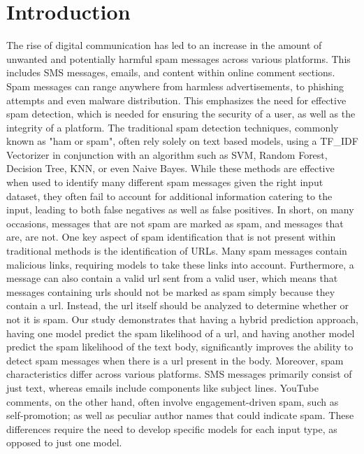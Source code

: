 \documentclass{article}
\begin{document}
\section{Introduction}
The rise of digital communication has led to an increase in the amount of unwanted and potentially harmful spam messages across various platforms. This includes SMS messages, emails, and content within online comment sections. Spam messages can range anywhere from harmless advertisements, to phishing attempts and even malware distribution. This emphasizes the need for effective spam detection, which is needed for ensuring the security of a user, as well as the integrity of a platform. The traditional spam detection techniques, commonly known as "ham or spam", often rely solely on text based models, using a TF\_IDF Vectorizer in conjunction with an algorithm such as SVM, Random Forest, Decision Tree, KNN, or even Naive Bayes. While these methods are effective when used to identify many different spam messages given the right input dataset, they often fail to account for additional information catering to the input, leading to both false negatives as well as false positives. In short, on many occasions, messages that are not spam are marked as spam, and messages that are, are not.
\newline
\newline
One key aspect of spam identification that is not present within traditional methods is the identification of URLs. Many spam messages contain malicious links, requiring models to take these links into account. Furthermore, a message can also contain a valid url sent from a valid user, which means that messages containing urls should not be marked as spam simply because they contain a url. Instead, the url itself should be analyzed to determine whether or not it is spam. Our study demonstrates that having a hybrid prediction approach, having one model predict the spam likelihood of a url, and having another model predict the spam likelihood of the text body, significantly improves the ability to detect spam messages when there is a url present in the body.
\newline
\newline
Moreover, spam characteristics differ across various platforms. SMS messages primarily consist of just text, whereas emails include components like subject lines. YouTube comments, on the other hand, often involve engagement-driven spam, such as self-promotion; as well as peculiar author names that could indicate spam. These differences require the need to develop specific models for each input type, as opposed to just one model.
\end{document}
